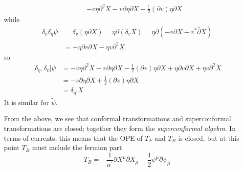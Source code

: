 \begin{tcolorbox}[breakable]
\begin{align*}
		&=-v\eta \partial ^{2}X-v\partial \eta \partial X-\tfrac{1}{2}(\partial
		v)\eta \partial X
	\end{align*}%
	while \begin{align*}
		\delta _{v}\delta _{\eta }\psi  &=\delta _{v}(\eta \partial X)=\eta
		\partial (\delta _{v}X)=\eta \partial (-v\partial X-v^{\ast }\bar{\partial}X)
		\\
		&=-\eta \partial v\partial X-\eta v\partial ^{2}X
	\end{align*}%
	so \begin{align*}
		\lbrack \delta _{\eta },\delta _{v}]\psi  &=-v\eta \partial ^{2}X-v\partial
		\eta \partial X-\tfrac{1}{2}(\partial v)\eta \partial X+\eta \partial
		v\partial X+\eta v\partial ^{2}X \\
		&=-v\partial \eta \partial X+\tfrac{1}{2}(\partial v)\eta \partial X \\
		&=\delta _{\eta ^{\prime }}X
	\end{align*}%
	It is similar for $\tilde{\psi}$.
\end{tcolorbox}
From the above, we see that conformal transformations and superconformal transformations are closed; together they form the \emph{superconformal algebra}. In terms of currents, this means that the OPE of $T_{F}$ and $T_{B}$ is closed, but at this point $T_{B}$ must include the fermion part
\begin{equation}
	T_{B}=-\frac{1}{\alpha^{\prime}}\partial X^{\mu}\partial X_{\mu}-\frac{1}{2}\psi^{\mu}\partial\psi_{\mu}
\end{equation}

